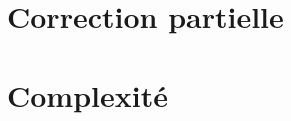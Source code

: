 \documentclass[12pt,a4paper]{report}
\begin{document}

\chapter{Correction partielle}


\chapter{Complexité}
\end{document}

